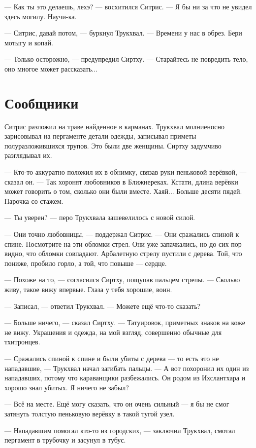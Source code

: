 --- Как ты это делаешь, лехэ? --- восхитился Ситрис.
--- Я бы ни за что не увидел здесь могилу.
Научи-ка.

--- Ситрис, давай потом, --- буркнул Трукхвал.
--- Времени у нас в обрез.
Бери мотыгу и копай.

--- Только осторожно, --- предупредил Сиртху.
--- Старайтесь не повредить тело, оно многое может рассказать...

\section{Сообщники}

Ситрис разложил на траве найденное в карманах.
Трукхвал молниеносно зарисовывал на пергаменте детали одежды, записывал приметы полуразложившихся трупов.
Это были две женщины.
Сиртху задумчиво разглядывал их.

--- Кто-то аккуратно положил их в обнимку, связав руки пеньковой верёвкой, --- сказал он.
--- Так хоронят любовников в Ближнереках.
Кстати, длина верёвки может говорить о том, сколько они были вместе.
Хаяй...
Больше десяти пядей.
Парочка со стажем.

--- Ты уверен? --- перо Трукхвала зашевелилось с новой силой.

--- Они точно любовницы, --- поддержал Ситрис.
--- Они сражались спиной к спине.
Посмотрите на эти обломки стрел.
Они уже запачкались, но до сих пор видно, что обломки совпадают.
Арбалетную стрелу пустили с дерева.
Той, что пониже, пробило горло, а той, что повыше --- сердце.

--- Похоже на то, --- согласился Сиртху, пощупав пальцем стрелы.
--- Сколько живу, такое вижу впервые.
Глаза у тебя хорошие, воин.

--- Записал, --- ответил Трукхвал.
--- Можете ещё что-то сказать?

--- Больше ничего, --- сказал Сиртху.
--- Татуировок, приметных знаков на коже не вижу.
Украшения и одежда, на мой взгляд, совершенно обычные для тхитронцев.

--- Сражались спиной к спине и были убиты с дерева --- то есть это не нападавшие, --- Трукхвал начал загибать пальцы.
--- А вот похоронил их один из нападавших, потому что караванщики разбежались.
Он родом из Ихслантхара и хорошо знал убитых.
Я ничего не забыл?

--- Всё на месте.
Ещё могу сказать, что он очень сильный --- я бы не смог затянуть толстую пеньковую верёвку в такой тугой узел.

--- Нападавшим помогал кто-то из городских, --- заключил Трукхвал, смотал пергамент в трубочку и засунул в тубус.

